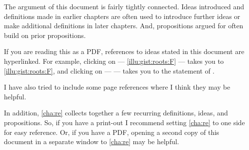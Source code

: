 \begin{note}
  The argument of this document is fairly tightly connected.
  Ideas introduced and definitions made in earlier chapters are often used to introduce further ideas or make additional definitions in later chapters.
  And, propositions argued for often build on prior propositions.

  If you are reading this as a PDF, references to ideas stated in this document are hyperlinked.
  For example, clicking on --- \autoref{illu:gist:roots:F} --- takes you to \autoref{illu:gist:roots:F}, and clicking on --- \qWhy{} --- takes you to the statement of \qWhy{}.

  I have also tried to include some page references where I think they may be helpful.

  In addition, \autoref{cha:re} collects together a few recurring definitions, ideas, and propositions.
  So, if you have a print-out I recommend setting \autoref{cha:re} to one side for easy reference.
  Or, if you have a PDF, opening a second copy of this document in a separate window to \autoref{cha:re} may be helpful.
\end{note}



